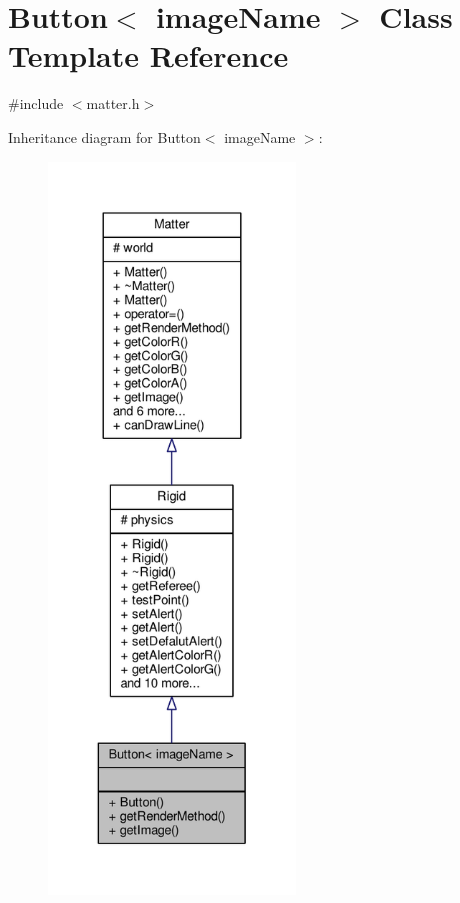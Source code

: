\hypertarget{classButton}{}\section{Button$<$ image\+Name $>$ Class Template Reference}
\label{classButton}


{\ttfamily \#include $<$matter.\+h$>$}



Inheritance diagram for Button$<$ image\+Name $>$\+:\nopagebreak
\begin{figure}[H]
\begin{center}
\leavevmode
\includegraphics[height=550pt]{classButton__inherit__graph}
\end{center}
\end{figure}


